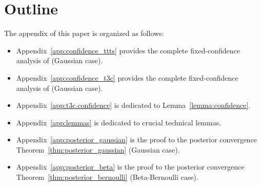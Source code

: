 \section{Outline}\label{app:outline}

The appendix of this paper is organized as follows:
\begin{itemize}[label=$\square$]
    \item Appendix~\ref{app:confidence_ttts} provides the complete fixed-confidence analysis of \TTTS (Gaussian case).
    \item Appendix~\ref{app:confidence_t3c} provides the complete fixed-confidence analysis of \TCC (Gaussian case).
    \item Appendix~\ref{app:t3c.confidence} is dedicated to Lemma~\ref{lemma:confidence}.
    \item Appendix~\ref{app:lemmas} is dedicated to crucial technical lemmas.
    \item Appendix~\ref{app:posterior_gaussian} is the proof to the posterior convergence Theorem~\ref{thm:posterior_gaussian} (Gaussian case).
    \item Appendix~\ref{app:posterior_beta} is the proof to the posterior convergence Theorem~\ref{thm:posterior_bernoulli} (Beta-Bernoulli case).
\end{itemize}
